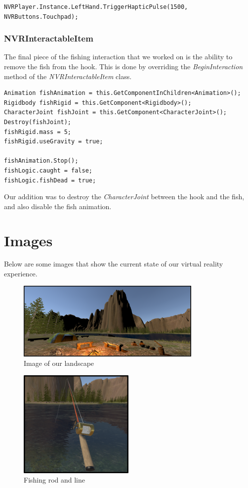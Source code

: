 \documentclass[10pt,journal,compsoc,onecolumn, draftclsnofoot]{IEEEtran}
\begin{document}
\begin{lstlisting}[language={[Sharp]C}]
NVRPlayer.Instance.LeftHand.TriggerHapticPulse(1500, NVRButtons.Touchpad);
\end{lstlisting}

\subsubsection{NVRInteractableItem}
The final piece of the fishing interaction that we worked on is the ability to remove the fish from the hook. This is done by overriding the \textit{BeginInteraction} method of the \textit{NVRInteractableItem} class.

\begin{lstlisting}[language={[Sharp]C}]
Animation fishAnimation = this.GetComponentInChildren<Animation>();
Rigidbody fishRigid = this.GetComponent<Rigidbody>();
CharacterJoint fishJoint = this.GetComponent<CharacterJoint>();
Destroy(fishJoint);
fishRigid.mass = 5;
fishRigid.useGravity = true;

fishAnimation.Stop();
fishLogic.caught = false;
fishLogic.fishDead = true;
\end{lstlisting}

Our addition was to destroy the \textit{CharacterJoint} between the hook and the fish, and also disable the fish animation.

\section{Images}
Below are some images that show the current state of our virtual reality experience.

\vspace{1cm}

\begin{figure}[h]
    \centering
    \includegraphics[width=0.80\textwidth]{landscape.png}
    \caption{Image of our landscape}
\end{figure}

\begin{figure}[h]
    \centering
    \includegraphics[width=0.5\textwidth]{fishingrod.png}
    \caption{Fishing rod and line}
\end{figure}
\end{document}
